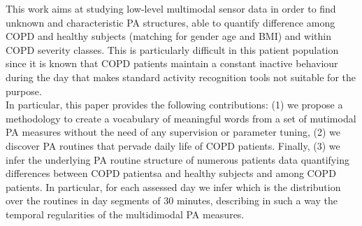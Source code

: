 This work aims at studying low-level multimodal sensor data in order to find unknown and characteristic PA structures, able to quantify difference among COPD and healthy subjects (matching for gender age and BMI) and within COPD severity classes. This is particularly difficult in this patient population
since it is known that COPD patients maintain a constant
inactive behaviour during the day that makes standard activity
recognition tools not suitable for the purpose.\\
In particular, this paper provides the following contributions: (1) we propose a methodology to create a vocabulary of meaningful words from a set of mutimodal PA measures without the need of any supervision or parameter tuning, (2) we discover PA routines that pervade daily life of COPD patients. Finally, (3) we infer the underlying PA routine structure of numerous patients data quantifying differences between COPD patientsa and healthy subjects and among COPD patients. In particular, for each assessed day we infer which is the distribution over the routines in day segments of 30 minutes, describing in such a way the temporal regularities of the multidimodal PA measures.


